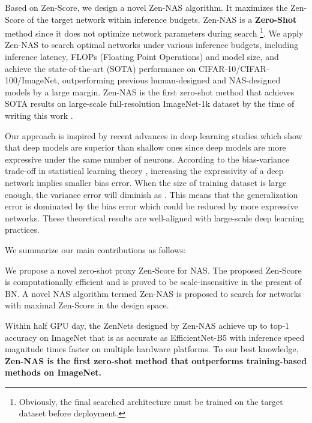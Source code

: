 \documentclass{article}
\providecommand{\citep}{\cite}
\begin{document}
Based on Zen-Score, we design a novel Zen-NAS algorithm. It maximizes the Zen-Score of the target network within inference budgets. Zen-NAS is a \textbf{Zero-Shot} method since it does not optimize network parameters during search \footnote{Obviously, the final searched architecture must be trained on the target dataset before deployment.}. We apply Zen-NAS to search optimal networks under various inference budgets, including inference latency, FLOPs (Floating Point Operations) and model size, and achieve the state-of-the-art (SOTA) performance on CIFAR-10/CIFAR-100/ImageNet, outperforming previous human-designed and NAS-designed models by a large margin. Zen-NAS is the first zero-shot method that achieves SOTA results on large-scale full-resolution ImageNet-1k dataset \cite{dengImageNetLargescaleHierarchical2009} by the time of writing this work \cite{mellorNeuralArchitectureSearch2021,abdelfattahZeroCostProxiesLightweight2021,chen2021neural}.

Our approach is inspired by recent advances in deep learning studies \citep{montufarNumberLinearRegions2014,danielyDeeperUnderstandingNeural2016,liangWhyDeepNeural2016a,pooleExponentialExpressivityDeep2016,cohenInductiveBiasDeep2017,luExpressivePowerNeural2017,maithraraghuExpressivePowerDeep2017,rolnickPowerDeeperNetworks2018,serraBoundingCountingLinear2018,haninComplexityLinearRegions2019,xiongNumberLinearRegions2020} which show that deep models are superior than shallow ones since deep models are more expressive under the same number of neurons. According to the bias-variance trade-off in statistical learning theory \cite{koltchinskii2011oracle}, increasing the expressivity of a deep network implies smaller bias error. When the size   of training dataset is large enough, the variance error will diminish as . This means that the generalization error is dominated by the bias error which could be reduced by more expressive networks. These theoretical results are well-aligned with large-scale deep learning practices\citep{nguyenWideDeepNetworks2021,touvronTrainingDataefficientImage2021,phamMetaPseudoLabels2021}. 

We summarize our main contributions as follows:
\begin{compactitem}
 \item We propose a novel zero-shot proxy Zen-Score for NAS. The proposed Zen-Score is computationally efficient and is proved to be scale-insensitive in the present of BN. A novel NAS algorithm termed Zen-NAS is proposed to search for networks with maximal Zen-Score  in the design space.
\item Within half GPU day, the ZenNets designed by Zen-NAS achieve up to  top-1 accuracy on ImageNet that is as accurate as EfficientNet-B5 with inference speed magnitude times faster on multiple hardware platforms. To our best knowledge, \textbf{Zen-NAS is the first zero-shot method that outperforms training-based methods on ImageNet.}
\end{compactitem}
\end{document}

